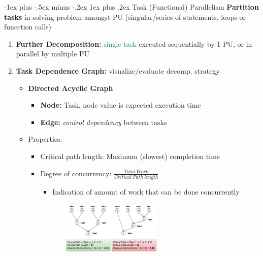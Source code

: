 \documentclass[10pt,landscape]{article}
\makeatletter
\newcommand{\subsubsubsection}{\@startsection{subsubsection}{3}{0mm}%
                                {-1ex plus -.5ex minus -.2ex}%
                                {1ex plus .2ex}%
                                {\normalfont\scriptsize\bfseries}}
\makeatother
\begin{document}
\begin{multicols*}{3}
\subsubsubsection{Task (Functional) Parallelism} 
\textbf{Partition tasks} in solving problem amongst PU (singular/series of statements, loops or funcction calls)
\begin{enumerate}[topsep=0pt,noitemsep,wide=0pt, leftmargin=\dimexpr\labelwidth + 2\labelsep\relax]
    \item \textbf{Further Decomposition:} \textcolor{teal}{single task} executed sequentially by 1 PU, or in parallel by multiple PU
    \item \textbf{Task Dependence Graph:} visualize/evaluate decomp. strategy
    \begin{itemize}[topsep=0pt,noitemsep,wide=0pt, leftmargin=\dimexpr{} + 2\relax]
        \item \textbf{Directed Acyclic Graph}
        \begin{itemize}[topsep=0pt,noitemsep,wide=0pt, leftmargin=\dimexpr{} + 2\relax]
            \item \textbf{Node:} Task, node value is expected execution time
            \item \textbf{Edge:} \textit{control dependency} between tasks
        \end{itemize}
        \item Properties:
        \begin{itemize}[topsep=0pt,noitemsep,wide=0pt, leftmargin=\dimexpr{} + 2\relax]
            \item Critical path length: Maximum (slowest) completion time
            \item Degree of concurrency: $\frac{Total \ Work}{Critical \ Path \ length}$
            \begin{itemize}[topsep=0pt,noitemsep,wide=0pt, leftmargin=\dimexpr{} + 2\relax]
                \item Indication of amount of work that can be done concurrently
            \end{itemize}
            \includegraphics*[width=7.4cm, height=2.5cm]{images/criticalpathlength.PNG}
        \end{itemize}
    \end{itemize}
\end{enumerate}


\end{multicols*}
\end{document}
